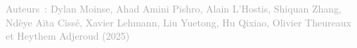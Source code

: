 \documentclass[../main.tex]{subfiles}
\begin{document}
\begin{multicols}{2}
\begin{center}
    \label{radar}
    \begin{flushright}
        \begin{minipage}{1\linewidth}
            \justifying
            \noindent
            \scriptsize{\textcolor{darkgray}{Auteurs~: Dylan Moinse, Ahad Amini Pishro, Alain L'Hostis, Shiquan Zhang, Ndèye Aïta Cissé, Xavier Lehmann, Liu Yuetong, Hu Qixiao, Olivier Theureaux et Heythem Adjeroud (2025)}}
        \end{minipage}
    \end{flushright}
\end{center}

    \end{multicols}

    
\end{document}
